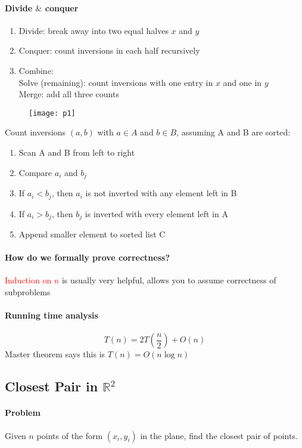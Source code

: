 \documentclass[11pt]{article}
\newcommand{\real}[0]{\mathbb{R}}
\begin{document}
\paragraph{Divide $\&$ conquer}
\begin{enumerate} 
	\item Divide: break away into two equal halves $x$ and $y$
	\item Conquer: count inversions in each half recursively
	\item Combine: \\
	Solve (remaining): count inversions with one entry in $x$ and one in $y$ \\
	Merge: add all three counts
\end{enumerate}

\begin{figure}[h]
	\centering
	\texttt{[image: p1]}
\end{figure}

Count inversions $(a,b)$ with $a \in A$ and $b \in B$, assuming A and B are sorted:
\begin{enumerate}
	\item Scan A and B from left to right
	\item Compare $a_i$ and $b_j$
	\item If $a_i < b_j$, then $a_i$ is not inverted with any element left in B
	\item If $a_i > b_j$, then $b_j$ is inverted with every element left in A
	\item Append smaller element to sorted list C
\end{enumerate}

\paragraph{How do we formally prove correctness?}
\textcolor{red}{Induction on $n$} is usually very helpful, allows you to assume correctness of subproblems

\paragraph{Running time analysis}
$$T(n) = 2T(\frac{n}{2}) + O(n)$$
Master theorem says this is $T(n) = O(n \log n)$

\subsection{Closest Pair in $\real^2$}
\paragraph{Problem}
Given $n$ points of the form $(x_i, y_i)$ in the plane, find the closest pair of points.
\end{document}
